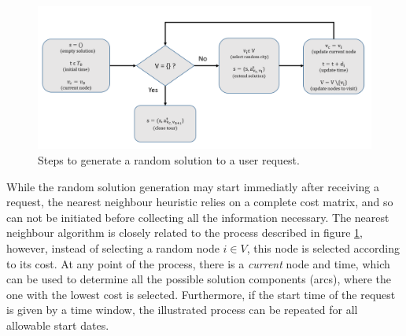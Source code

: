\begin{figure}[htpb]
  \centering
  \includegraphics[width=\textwidth]{./Figures/system_implementation/random_solution.png}
  \caption{Steps to generate a random solution to a user request.}
  \label{fig:random_solution}  
\end{figure}

While the random solution generation may start immediatly after receiving a request,
the nearest neighbour heuristic relies on a complete cost matrix,
and so can not be initiated before collecting all the information necessary.
The nearest neighbour algorithm is closely related to the process described in figure \ref{fig:random_solution},
however, instead of selecting a random node $i \in V$,
this node is selected according to its cost. At any point of the process, there is a \textit{current} node and time,
which can be used to determine all the possible solution components (arcs), where the one with the lowest cost is selected.
Furthermore, if the start time of the request is given by a time window,
the illustrated process can be repeated for all allowable start dates.






